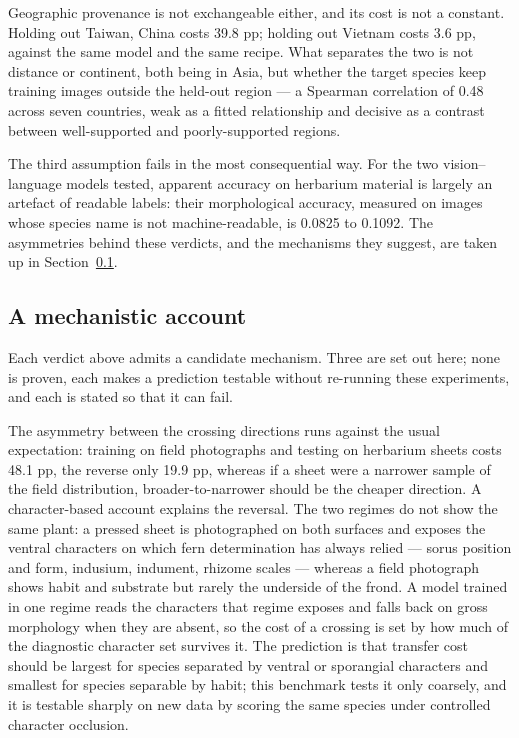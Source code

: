 \documentclass[preprint,12pt,authoryear]{elsarticle}
\begin{document}
Geographic provenance is not exchangeable either, and its cost is not a constant. Holding out Taiwan, China costs 39.8 pp; holding out Vietnam costs 3.6 pp, against the same model and the same recipe. What separates the two is not distance or continent, both being in Asia, but whether the target species keep training images outside the held-out region --- a Spearman correlation of 0.48 across seven countries, weak as a fitted relationship and decisive as a contrast between well-supported and poorly-supported regions.

The third assumption fails in the most consequential way. For the two vision--language models tested, apparent accuracy on herbarium material is largely an artefact of readable labels: their morphological accuracy, measured on images whose species name is not machine-readable, is 0.0825 to 0.1092. The asymmetries behind these verdicts, and the mechanisms they suggest, are taken up in Section~\ref{sec:10.2}.

\setcounter{section}{10}

\setcounter{subsection}{1}

\subsection{A mechanistic account}\label{sec:10.2}

Each verdict above admits a candidate mechanism. Three are set out here; none is proven, each makes a prediction testable without re-running these experiments, and each is stated so that it can fail.

The asymmetry between the crossing directions runs against the usual expectation: training on field photographs and testing on herbarium sheets costs 48.1 pp, the reverse only 19.9 pp, whereas if a sheet were a narrower sample of the field distribution, broader-to-narrower should be the cheaper direction. A character-based account explains the reversal. The two regimes do not show the same plant: a pressed sheet is photographed on both surfaces and exposes the ventral characters on which fern determination has always relied --- sorus position and form, indusium, indument, rhizome scales --- whereas a field photograph shows habit and substrate but rarely the underside of the frond. A model trained in one regime reads the characters that regime exposes and falls back on gross morphology when they are absent, so the cost of a crossing is set by how much of the diagnostic character set survives it. The prediction is that transfer cost should be largest for species separated by ventral or sporangial characters and smallest for species separable by habit; this benchmark tests it only coarsely, and it is testable sharply on new data by scoring the same species under controlled character occlusion.
\end{document}
